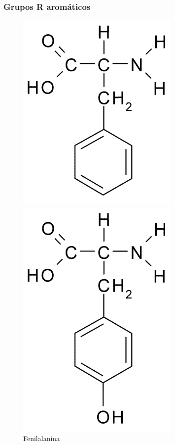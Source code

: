 \subsubsection*{Grupos R aromáticos}
\begin{figure}[H]
	\begin{center}
		\begin{minipage}{0.3\linewidth}
			\centering   
			\includegraphics[width=0.7\linewidth]{secProteins/figures/phenylalanine.png}	
			\caption{Fenilalanina}
			\label{fig:phenylalanine}
		\end{minipage}
		\begin{minipage}{0.3\linewidth}
			\centering   
			\includegraphics[width=0.59\linewidth]{secProteins/figures/tyrosine.png}

\end{minipage}
\end{center}
\end{figure}
